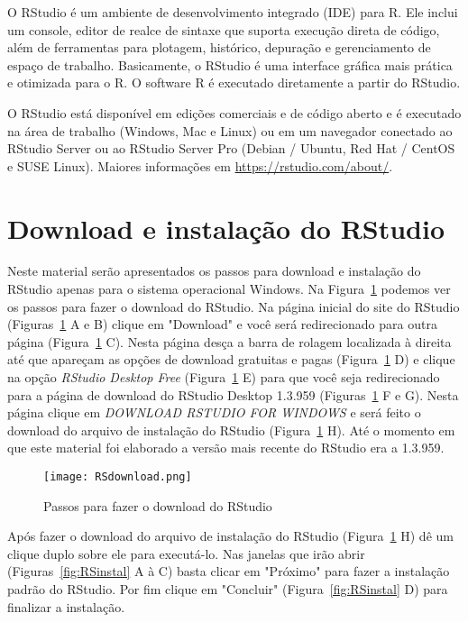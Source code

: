 \documentclass[11pt,fleqn]{book} %
\begin{document}
O RStudio é um ambiente de desenvolvimento integrado (IDE) para R. Ele inclui um console, editor de realce de sintaxe que suporta execução direta de código, além de ferramentas para plotagem, histórico, depuração e gerenciamento de espaço de trabalho. Basicamente, o RStudio é uma interface gráfica mais prática e otimizada para o R. O software R é executado diretamente a partir do RStudio. 

O RStudio está disponível em edições comerciais e de código aberto e é executado na área de trabalho (Windows, Mac e Linux) ou em um navegador conectado ao RStudio Server ou ao RStudio Server Pro (Debian / Ubuntu, Red Hat / CentOS e SUSE Linux). Maiores informações em \url{https://rstudio.com/about/}.



\section{Download e instalação do RStudio}

Neste material serão apresentados os passos para download e instalação do RStudio apenas para o sistema operacional Windows. Na Figura~\ref{fig:RSdownload} podemos ver os passos para fazer o download do RStudio. Na página inicial do site do RStudio (Figuras~\ref{fig:RSdownload} A e B) clique em "Download" e você será redirecionado para outra página (Figura~\ref{fig:RSdownload} C). Nesta página desça a barra de rolagem localizada à direita até que apareçam as opções de download gratuitas e pagas (Figura~\ref{fig:RSdownload} D) e clique na opção {\itshape RStudio Desktop Free} (Figura~\ref{fig:RSdownload} E) para que você seja redirecionado para a página de download do RStudio Desktop 1.3.959 (Figuras~\ref{fig:RSdownload} F e G). Nesta página clique em {\itshape DOWNLOAD RSTUDIO FOR WINDOWS} e será feito o download do arquivo de instalação do RStudio (Figura~\ref{fig:RSdownload} H). Até o momento em que este material foi elaborado a versão mais recente do RStudio era a 1.3.959.



\begin{figure}[t!]
\centering\texttt{[image: RSdownload.png]}
\setlength{\abovecaptionskip}{0.5pt}
\caption{Passos para fazer o download do RStudio}
\label{fig:RSdownload} %
\end{figure}


Após fazer o download do arquivo de instalação do RStudio (Figura~\ref{fig:RSdownload} H) dê um clique duplo sobre ele para executá-lo. Nas janelas que irão abrir (Figuras~\ref{fig:RSinstal} A à C) basta clicar em "Próximo" para fazer a instalação padrão do RStudio. Por fim clique em "Concluir" (Figura~\ref{fig:RSinstal} D) para finalizar a instalação. 
\end{document}
